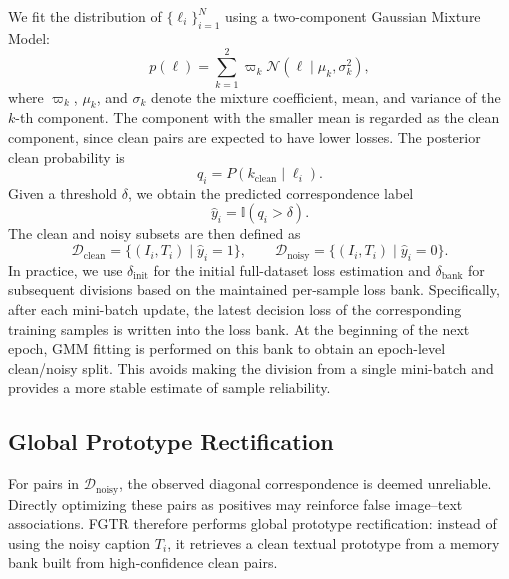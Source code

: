 We fit the distribution of $\{\ell_i\}_{i=1}^{N}$ using a two-component Gaussian Mixture Model:
\begin{equation}
    p(\ell)=\sum_{k=1}^{2}\varpi_k\mathcal{N}(\ell\mid\mu_k,\sigma_k^2),
\end{equation}
where $\varpi_k$, $\mu_k$, and $\sigma_k$ denote the mixture coefficient, mean, and variance of the $k$-th component. The component with the smaller mean is regarded as the clean component, since clean pairs are expected to have lower losses. The posterior clean probability is
\begin{equation}
    q_i=P(k_{\mathrm{clean}}\mid \ell_i).
\end{equation}
Given a threshold $\delta$, we obtain the predicted correspondence label
\begin{equation}
    \hat{y}_i=\mathbb{I}(q_i>\delta).
\end{equation}
The clean and noisy subsets are then defined as
\begin{equation}
\mathcal{D}_{\mathrm{clean}}=
\{(I_i,T_i)\mid \hat{y}_i=1\},
\qquad
\mathcal{D}_{\mathrm{noisy}}=
\{(I_i,T_i)\mid \hat{y}_i=0\}.
\end{equation}
In practice, we use $\delta_{\mathrm{init}}$ for the initial full-dataset loss estimation and $\delta_{\mathrm{bank}}$ for subsequent divisions based on the maintained per-sample loss bank. Specifically, after each mini-batch update, the latest decision loss of the corresponding training samples is written into the loss bank. At the beginning of the next epoch, GMM fitting is performed on this bank to obtain an epoch-level clean/noisy split. This avoids making the division from a single mini-batch and provides a more stable estimate of sample reliability.

\subsection{Global Prototype Rectification}
For pairs in $\mathcal{D}_{\mathrm{noisy}}$, the observed diagonal correspondence is deemed unreliable. Directly optimizing these pairs as positives may reinforce false image--text associations. FGTR therefore performs global prototype rectification: instead of using the noisy caption $T_i$, it retrieves a clean textual prototype from a memory bank built from high-confidence clean pairs.


